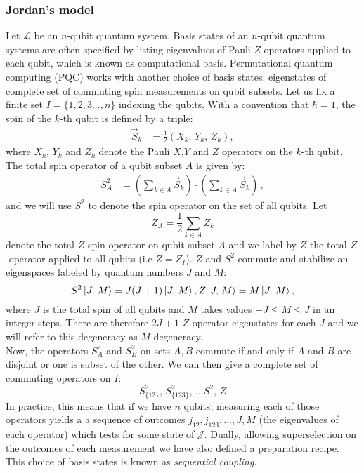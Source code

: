 \documentclass{article}
\begin{document}
\subsubsection{Jordan's model}
Let $\mathcal{L}$ be an $n$-qubit quantum system. Basis states of an $n$-qubit quantum systems are often specified by listing eigenvalues of Pauli-$Z$ operators applied to each qubit, which is known as computational basis.
Permutational quantum computing (PQC) works with another choice of basis states: eigenstates of complete set of commuting spin measurements on qubit subsets. Let us fix a finite set $I=\{1,2,3...,n\}$ indexing the qubits. With a convention that $\hbar = 1$, the spin of the $k$-th qubit is defined by a triple:
\begin{align*}
\vec{S}_k &= \frac{1}{2} \left( X_k, \, Y_k, \,Z_k \right),
\end{align*}
where $X_k$, $Y_k$ and $Z_k$ denote the Pauli $X$,$Y$ and $Z$ operators on the $k$-th qubit. The total spin operator of a qubit subset $A$  is given by:
\begin{align*}
S_A^2 &= \left( \sum_{k \in A} \vec{S}_k \right) \cdot  \left( \sum_{k \in A} \vec{S}_k \right)\,,
\end{align*} 
and we will use $S^2$ to denote the spin operator on the set of all qubits. 
Let 
$$Z_A = \frac{1}{2} \sum_{k \in A} Z_k $$ 
denote the total $Z$-spin operator on qubit subset $A$ and we label by $Z$ the total $Z$-operator applied to all qubits (i.e $Z=Z_I$). $Z$ and $S^2$ commute and stabilize an eigenspaces labeled by quantum numbers $J$ and $M$: 
\begin{equation}
S^2  \ket{J, \, M} = J (J +1 ) \ket{J, \, M},  \\
Z \ket{J, \, M} = M \ket{J, \, M},
\end{equation} 
where $J$ is the total spin of all qubits and $M$ takes values $ -J \leq M \leq J$ in an integer steps. There are therefore $2J + 1$ $Z$-operator eigenstates for each $J$ and we will refer to this degeneracy as $M$-degeneracy. \\
Now, the operators $S_A^2$ and $S_B^2$ on sets $A, B$ commute if and only if $A$ and $B$ are disjoint or one is subset of the other. We can then give a complete set of commuting operators on $I$:
\begin{equation} \label{comS}
S_{\lbrace12\rbrace}^2, \, S_{\lbrace123\rbrace}^2, \, \ldots S^2, \, Z
\end{equation}
In practice, this means that if we have $n$ qubits, measuring each of those operators yields a a sequence of outcomes $j_{12}, j_{123}, ... , J, M$ (the eigenvalues of each operator) which tests for some state of $\mathcal{J}$. Dually, allowing superselection on the outcomes of each measurement we have also defined a preparation recipe. This choice of basis states is known as \textit{sequential coupling}.\\
\end{document}
